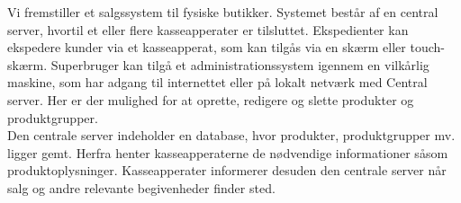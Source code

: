 Vi fremstiller et salgssystem til fysiske butikker. Systemet består af en central server, hvortil et eller flere kasseapperater er tilsluttet. Ekspedienter kan ekspedere kunder via et kasseapperat, som kan tilgås via en skærm eller touch-skærm. Superbruger kan tilgå et administrationssystem igennem en vilkårlig maskine, som har adgang til internettet eller på lokalt netværk med Central server. Her er der mulighed for at oprette, redigere og slette produkter og produktgrupper.\\

Den centrale server indeholder en database, hvor produkter, produktgrupper mv. ligger gemt. Herfra henter kasseapperaterne de nødvendige informationer såsom produktoplysninger. Kasseapperater informerer desuden den centrale server når salg og andre relevante begivenheder finder sted.